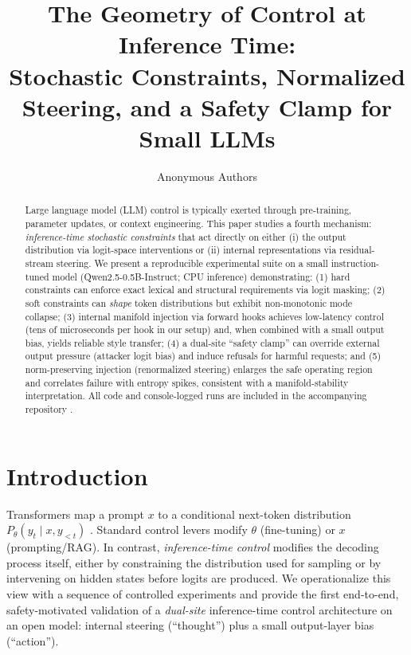 \documentclass{article}
\title{The Geometry of Control at Inference Time:\\
Stochastic Constraints, Normalized Steering, and a Safety Clamp for Small LLMs}
\author{%
Anonymous Authors \\
}
\begin{document}
\maketitle

\begin{abstract}
Large language model (LLM) control is typically exerted through pre-training, parameter updates, or context engineering.
This paper studies a fourth mechanism: \emph{inference-time stochastic constraints} that act directly on either (i) the output distribution via logit-space interventions or (ii) internal representations via residual-stream steering.
We present a reproducible experimental suite on a small instruction-tuned model (Qwen2.5-0.5B-Instruct; CPU inference) demonstrating: (1) hard constraints can enforce exact lexical and structural requirements via logit masking; (2) soft constraints can \emph{shape} token distributions but exhibit non-monotonic mode collapse; (3) internal manifold injection via forward hooks achieves low-latency control (tens of microseconds per hook in our setup) and, when combined with a small output bias, yields reliable style transfer; (4) a dual-site ``safety clamp'' can override external output pressure (attacker logit bias) and induce refusals for harmful requests; and (5) norm-preserving injection (renormalized steering) enlarges the safe operating region and correlates failure with entropy spikes, consistent with a manifold-stability interpretation.
All code and console-logged runs are included in the accompanying repository \citep{thiswork2026}.
\end{abstract}

\section{Introduction}

Transformers map a prompt $x$ to a conditional next-token distribution $P_\theta(y_t \mid x, y_{<t})$ \citep{vaswani2017attention}.
Standard control levers modify $\theta$ (fine-tuning) or $x$ (prompting/RAG).
In contrast, \emph{inference-time control} modifies the decoding process itself, either by constraining the distribution used for sampling or by intervening on hidden states before logits are produced.
We operationalize this view with a sequence of controlled experiments and provide the first end-to-end, safety-motivated validation of a \emph{dual-site} inference-time control architecture on an open model: internal steering (``thought'') plus a small output-layer bias (``action'').
\end{document}
